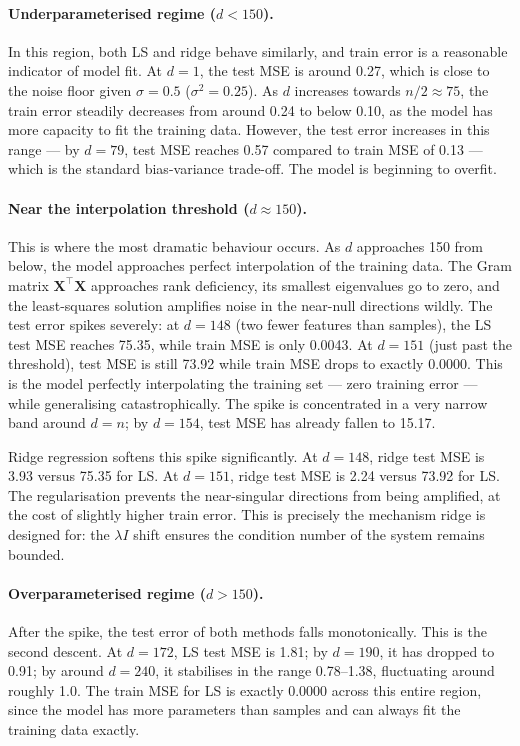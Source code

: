 \documentclass[11pt,a4paper]{article}
\begin{document}
\paragraph{Underparameterised regime ($d < 150$).}
In this region, both LS and ridge behave similarly, and train error is a reasonable indicator of model fit. At $d = 1$, the test MSE is around 0.27, which is close to the noise floor given $\sigma = 0.5$ ($\sigma^2 = 0.25$). As $d$ increases towards $n/2 \approx 75$, the train error steadily decreases from around 0.24 to below 0.10, as the model has more capacity to fit the training data. However, the test error increases in this range --- by $d = 79$, test MSE reaches 0.57 compared to train MSE of 0.13 --- which is the standard bias-variance trade-off. The model is beginning to overfit.

\paragraph{Near the interpolation threshold ($d \approx 150$).}
This is where the most dramatic behaviour occurs. As $d$ approaches 150 from below, the model approaches perfect interpolation of the training data. The Gram matrix $\mathbf{X}^\top\mathbf{X}$ approaches rank deficiency, its smallest eigenvalues go to zero, and the least-squares solution amplifies noise in the near-null directions wildly. The test error spikes severely: at $d = 148$ (two fewer features than samples), the LS test MSE reaches 75.35, while train MSE is only 0.0043. At $d = 151$ (just past the threshold), test MSE is still 73.92 while train MSE drops to exactly 0.0000. This is the model perfectly interpolating the training set --- zero training error --- while generalising catastrophically. The spike is concentrated in a very narrow band around $d = n$; by $d = 154$, test MSE has already fallen to 15.17.

Ridge regression softens this spike significantly. At $d = 148$, ridge test MSE is 3.93 versus 75.35 for LS. At $d = 151$, ridge test MSE is 2.24 versus 73.92 for LS. The regularisation prevents the near-singular directions from being amplified, at the cost of slightly higher train error. This is precisely the mechanism ridge is designed for: the $\lambda I$ shift ensures the condition number of the system remains bounded.

\paragraph{Overparameterised regime ($d > 150$).}
After the spike, the test error of both methods falls monotonically. This is the second descent. At $d = 172$, LS test MSE is 1.81; by $d = 190$, it has dropped to 0.91; by around $d = 240$, it stabilises in the range 0.78--1.38, fluctuating around roughly 1.0. The train MSE for LS is exactly 0.0000 across this entire region, since the model has more parameters than samples and can always fit the training data exactly.
\end{document}
